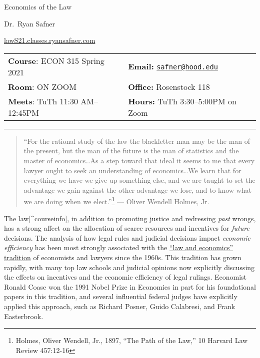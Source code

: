 \documentclass{article}
\begin{document}
\sffamily

\centerline{\Huge Economics of the Law}

\vspace{3 mm}

\centerline{\large Dr.~Ryan Safner}
\vspace{2 mm}
\centerline{\large \href{http://lawS21.classes.ryansafner.com}{lawS21.classes.ryansafner.com}}

\vspace{5 mm}

\begin{tabular}{@{}p{3.5in}p{3.5in}}           
\textbf{Course}: ECON 315 Spring
2021  & \textbf{Email:}  \href{mailto:safner@hood.edu}{\nolinkurl{safner@hood.edu}}\\
\textbf{Room}:  ON ZOOM & \textbf{Office:}  Rosenstock 118\\
\textbf{Meets}: TuTh 11:30 AM--12:45PM & \textbf{Hours:}  TuTh
3:30--5:00PM on Zoom\\ 
\end{tabular}

\vspace{5 mm}

\hrule


\begin{quote}
``For the rational study of the law the blackletter man may be the man
of the present, but the man of the future is the man of statistics and
the master of economics\ldots As a step toward that ideal it seems to me
that every lawyer ought to seek an understanding of economics\ldots We
learn that for everything we have we give up something else, and we are
taught to set the advantage we gain against the other advantage we lose,
and to know what we are doing when we elect.''\footnote{Holmes, Oliver
  Wendell, Jr., 1897, ``The Path of the Law,'' 10 Harvard Law Review
  457:12-16} {--- Oliver Wendell Holmes, Jr.}
\end{quote}

{The law}{[}\^{}courseinfo{]}, in addition to promoting justice and
redressing \emph{past} wrongs, has a strong affect on the allocation of
scarce resources and incentives for \emph{future} decisions. The
analysis of how legal rules and judicial decisions impact \emph{economic
efficiency} has been most strongly associated with the
\href{https://en.wikipedia.org/wiki/Law_and_economics}{``law and
economics'' tradition} of economists and lawyers since the 1960s. This
tradition has grown rapidly, with many top law schools and judicial
opinions now explicitly discussing the effects on incentives and the
economic efficiency of legal rulings. Economist Ronald Coase won the
1991 Nobel Prize in Economics in part for his foundational papers in
this tradition, and several influential federal judges have explicitly
applied this approach, such as Richard Posner, Guido Calabresi, and
Frank Easterbrook.
\end{document}
